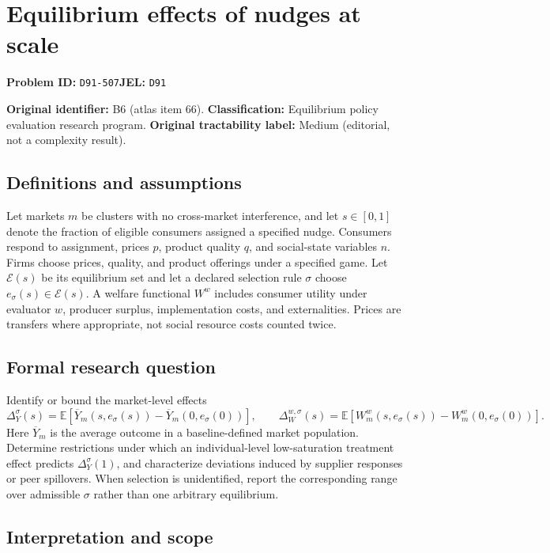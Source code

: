 \documentclass[11pt,a4paper]{article}
\begin{document}
\section*{Equilibrium effects of nudges at scale}
\textbf{Problem ID:} \texttt{D91-507}\quad \textbf{JEL:} \texttt{D91}\par
\label{problem:OP-0066}
\label{atlas:prob:B6}

\noindent\textbf{Original identifier:} B6 (atlas item 66). \textbf{Classification:} Equilibrium policy evaluation research program. \textbf{Original tractability label:} Medium (editorial, not a complexity result).

\subsection*{Definitions and assumptions}

Let markets $m$ be clusters with no cross-market interference, and let $s\in[0,1]$ denote the fraction of eligible consumers assigned a specified nudge. Consumers respond to assignment, prices $p$, product quality $q$, and social-state variables $n$. Firms choose prices, quality, and product offerings under a specified game. Let $\mathcal E(s)$ be its equilibrium set and let a declared selection rule $\sigma$ choose $e_\sigma(s)\in\mathcal E(s)$. A welfare functional $W^w$ includes consumer utility under evaluator $w$, producer surplus, implementation costs, and externalities. Prices are transfers where appropriate, not social resource costs counted twice.

\subsection*{Formal research question}

Identify or bound the market-level effects
\[
\Delta_Y^\sigma(s)=\mathbb E[\overline Y_m(s,e_\sigma(s))-\overline Y_m(0,e_\sigma(0))],\qquad
\Delta_W^{w,\sigma}(s)=\mathbb E[W_m^w(s,e_\sigma(s))-W_m^w(0,e_\sigma(0))].
\]
Here $\overline Y_m$ is the average outcome in a baseline-defined market population. Determine restrictions under which an individual-level low-saturation treatment effect predicts $\Delta_Y^\sigma(1)$, and characterize deviations induced by supplier responses or peer spillovers. When selection is unidentified, report the corresponding range over admissible $\sigma$ rather than one arbitrary equilibrium.

\subsection*{Interpretation and scope}
\end{document}
